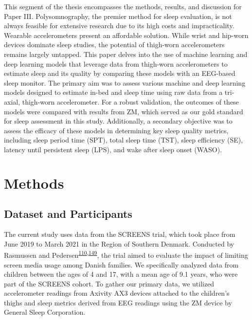 \documentclass[
  10pt,
]{scrbook}
\begin{document}
This segment of the thesis encompasses the methods, results, and
discussion for Paper III. Polysomnography, the premier method for sleep
evaluation, is not always feasible for extensive research due to its
high costs and impracticality. Wearable accelerometers present an
affordable solution. While wrist and hip-worn devices dominate sleep
studies, the potential of thigh-worn accelerometers remains largely
untapped. This paper delves into the use of machine learning and deep
learning models that leverage data from thigh-worn accelerometers to
estimate sleep and its quality by comparing these models with an
EEG-based sleep monitor. The primary aim was to assess various machine
and deep learning models designed to estimate in-bed and sleep time
using raw data from a tri-axial, thigh-worn accelerometer. For a robust
validation, the outcomes of these models were compared with results from
ZM, which served as our gold standard for sleep assessment in this
study. Additionally, a secondary objective was to assess the efficacy of
these models in determining key sleep quality metrics, including sleep
period time (SPT), total sleep time (TST), sleep efficiency (SE),
latency until persistent sleep (LPS), and wake after sleep onset (WASO).

\hypertarget{methods-2}{%
\section{Methods}\label{methods-2}}

\hypertarget{dataset-and-participants}{%
\subsection{Dataset and Participants}\label{dataset-and-participants}}

The current study uses data from the SCREENS trial, which took place
from June 2019 to March 2021 in the Region of Southern Denmark.
Conducted by Rasmussen and
Pedersen\textsuperscript{\protect\hyperlink{ref-rasmussen_short-term_2020}{110},\protect\hyperlink{ref-pedersen_effects_2022}{149}},
the trial aimed to evaluate the impact of limiting screen media usage
among Danish families. We specifically analyzed data from children
between the ages of 4 and 17, with a mean age of 9.1 years, who were
part of the SCREENS cohort. To gather our primary data, we utilized
accelerometer readings from Axivity AX3 devices attached to the
children's thighs and sleep metrics derived from EEG readings using the
ZM device by General Sleep Corporation.
\end{document}
